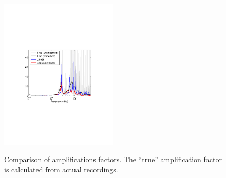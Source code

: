 \documentclass[11pt,letterpaper]{article}
\begin{document}
\begin{figure}[h]
    \centering
  \includegraphics[width=0.5\textwidth]{amplification_factor_comparison.pdf}\\
  \caption{Comparison of amplifications factors. The ``true'' amplification factor is calculated from actual recordings.}\label{fig:af_comparison}
\end{figure}







\end{document}
